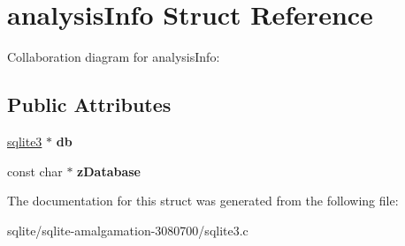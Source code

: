\hypertarget{structanalysis_info}{\section{analysis\+Info Struct Reference}
\label{structanalysis_info}
}


Collaboration diagram for analysis\+Info\+:
\subsection*{Public Attributes}
\begin{DoxyCompactItemize}
\item 
\hypertarget{structanalysis_info_a13108eadc55ffe73a8825fb91cc0f9b5}{\hyperlink{structsqlite3}{sqlite3} $\ast$ {\bfseries db}}\label{structanalysis_info_a13108eadc55ffe73a8825fb91cc0f9b5}

\item 
\hypertarget{structanalysis_info_accbe3c1f5613ffa13b9578e58a5d850a}{const char $\ast$ {\bfseries z\+Database}}\label{structanalysis_info_accbe3c1f5613ffa13b9578e58a5d850a}

\end{DoxyCompactItemize}


The documentation for this struct was generated from the following file\+:\begin{DoxyCompactItemize}
\item 
sqlite/sqlite-\/amalgamation-\/3080700/sqlite3.\+c\end{DoxyCompactItemize}
